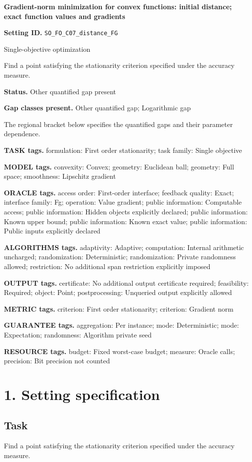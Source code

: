 \documentclass[10pt,a4paper]{article}
\begin{document}
\raggedright

{\LARGE\bfseries\sffamily\color{AtlasNavy} Gradient-norm minimization for convex functions: initial distance; exact function values and gradients\par}\vspace{5pt}
\textbf{Setting ID.} \texttt{SO\_\allowbreak{}FO\_\allowbreak{}C07\_\allowbreak{}distance\_\allowbreak{}FG}

Single-objective optimization

Find a point satisfying the stationarity criterion specified under the accuracy measure.

\textbf{Status.} Other quantified gap present

\textbf{Gap classes present.} Other quantified gap; Logarithmic gap

The regional bracket below specifies the quantified gaps and their parameter dependence.

\textbf{TASK tags.} formulation: First order stationarity; task family: Single objective

\textbf{MODEL tags.} convexity: Convex; geometry: Euclidean ball; geometry: Full space; smoothness: Lipschitz gradient

\textbf{ORACLE tags.} access order: First-order interface; feedback quality: Exact; interface family: Fg; operation: Value gradient; public information: Computable access; public information: Hidden objects explicitly declared; public information: Known upper bound; public information: Known exact value; public information: Public inputs explicitly declared

\textbf{ALGORITHMS tags.} adaptivity: Adaptive; computation: Internal arithmetic uncharged; randomization: Deterministic; randomization: Private randomness allowed; restriction: No additional span restriction explicitly imposed

\textbf{OUTPUT tags.} certificate: No additional output certificate required; feasibility: Required; object: Point; postprocessing: Unqueried output explicitly allowed

\textbf{METRIC tags.} criterion: First order stationarity; criterion: Gradient norm

\textbf{GUARANTEE tags.} aggregation: Per instance; mode: Deterministic; mode: Expectation; randomness: Algorithm private seed

\textbf{RESOURCE tags.} budget: Fixed worst-case budget; measure: Oracle calls; precision: Bit precision not counted

\section{1. Setting specification}
\subsection{Task}
Find a point satisfying the stationarity criterion specified under the accuracy measure.
\end{document}
